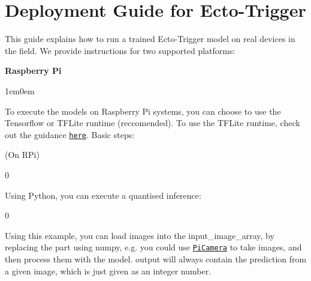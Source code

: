 \chapter{Deployment Guide for Ecto-\/\+Trigger }
\hypertarget{md_guides_2deployment}{}\label{md_guides_2deployment}
\label{md_guides_2deployment_autotoc_md9}%
%


This guide explains how to run a trained Ecto-\/\+Trigger model on real devices in the field. We provide instructions for two supported platforms:\+



{\bfseries{Raspberry Pi}}\begin{adjustwidth}{1em}{0em}


To execute the models on Raspberry Pi systems, you can choose to use the Tensorflow or TFLite runtime (reccomended). To use the TFLite runtime, check out the guidance \href{https://ai.google.dev/edge/litert/microcontrollers/python}{\texttt{here}}. Basic steps:\+

(On RPi) 
\begin{DoxyCode}{0}

\end{DoxyCode}


Using Python, you can execute a quantised inference:\+ 
\begin{DoxyCode}{0}
\DoxyCodeLine{}
\DoxyCodeLine{}
\DoxyCodeLine{}
\DoxyCodeLine{}

\end{DoxyCode}


Using this example, you can load images into the {\ttfamily input\+\_\+image\+\_\+array}, by replacing the part using numpy, e.\+g. you could use \href{https://github.com/raspberrypi/picamera2}{\texttt{Pi\+Camera}} to take images, and then process them with the model. {\ttfamily output\+[0]\+} will always contain the prediction from a given image, which is just given as an integer number. ~\newline


\end{adjustwidth}




